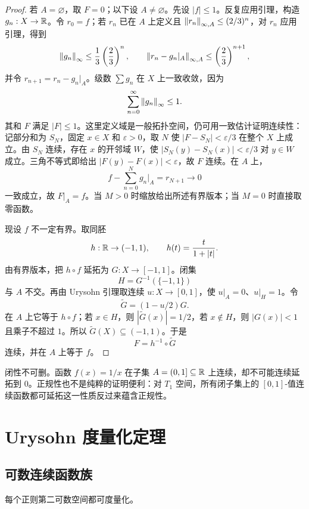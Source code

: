 \begin{proof}
若 \(A=\varnothing\)，取 \(F=0\)；以下设 \(A\ne\varnothing\)。先设 \(|f|\le1\)。反复应用引理，构造 \(g_n:X\to\mathbb{R}\)。令 \(r_0=f\)；若 \(r_n\) 已在 \(A\) 上定义且 \(\left\lVert r_n\right\rVert_{\infty,A}\le(2/3)^n\)，对 \(r_n\) 应用引理，得到
\[
 \left\lVert g_n\right\rVert_\infty\le\frac13\left(\frac23\right)^n,\qquad
 \left\lVert r_n-g_n|_A\right\rVert_{\infty,A}\le\left(\frac23\right)^{n+1},
\]
并令 \(r_{n+1}=r_n-g_n|_A\)。级数 \(\sum g_n\) 在 \(X\) 上一致收敛，因为
\[
 \sum_{n=0}^\infty\left\lVert g_n\right\rVert_\infty\le1.
\]
其和 \(F\) 满足 \(|F|\le1\)。这里定义域是一般拓扑空间，仍可用一致估计证明连续性：记部分和为 \(S_N\)，固定 \(x\in X\) 和 \(\varepsilon>0\)，取 \(N\) 使 \(|F-S_N|<\varepsilon/3\) 在整个 \(X\) 上成立。由 \(S_N\) 连续，存在 \(x\) 的开邻域 \(W\)，使 \(|S_N(y)-S_N(x)|<\varepsilon/3\) 对 \(y\in W\) 成立。三角不等式即给出 \(|F(y)-F(x)|<\varepsilon\)，故 \(F\) 连续。在 \(A\) 上，
\[
 f-\sum_{n=0}^{N}g_n|_A=r_{N+1}\longrightarrow0
\]
一致成立，故 \(F|_A=f\)。当 \(M>0\) 时缩放给出所述有界版本；当 \(M=0\) 时直接取零函数。

现设 \(f\) 不一定有界。取同胚
\[
 h:\mathbb{R}\to(-1,1),\qquad h(t)=\frac{t}{1+|t|}.
\]
由有界版本，把 \(h\circ f\) 延拓为 \(G:X\to[-1,1]\)。闭集
\[
 H=G^{-1}(\{-1,1\})
\]
与 \(A\) 不交。再由 Urysohn 引理取连续 \(u:X\to[0,1]\)，使 \(u|_A=0\)、\(u|_H=1\)。令
\[
 \widetilde G=(1-u/2)G.
\]
在 \(A\) 上它等于 \(h\circ f\)；若 \(x\in H\)，则 \(|\widetilde G(x)|=1/2\)，若 \(x\notin H\)，则 \(|G(x)|<1\) 且乘子不超过 \(1\)。所以 \(\widetilde G(X)\subseteq(-1,1)\)。于是
\[
 F=h^{-1}\circ\widetilde G
\]
连续，并在 \(A\) 上等于 \(f\)。
\end{proof}

闭性不可删。函数 \(f(x)=1/x\) 在子集 \(A=(0,1]\subseteq\mathbb{R}\) 上连续，却不可能连续延拓到 \(0\)。正规性也不是纯粹的证明便利：对 \(T_1\) 空间，所有闭子集上的 \([0,1]\)-值连续函数都可延拓这一性质反过来蕴含正规性。

\section{Urysohn 度量化定理}

\subsection{可数连续函数族}

\begin{theorem}
\label{thm:urysohn-metrization}
每个正则第二可数空间都可度量化。
\end{theorem}

